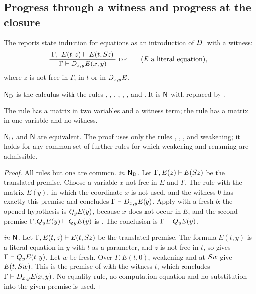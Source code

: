 \subsection{Progress through a witness and progress at the closure}
\label{kern:sec:direct}

The reports state induction for equations as an introduction of $D_{,}$
with a witness:
\[
 \infrule{\Gamma,\ E(t,z)\proves E(t,\Suc z)}
         {\Gamma\proves\D{x}{y}E(x,y)}\ \rulename{DP}
 \qquad(E\text{ a literal equation}),
\]
where $z$ is not free in $\Gamma$, in $t$ or in $D_{x,y}E$.

\begin{definition}
\label{kern:def:ND}
$\mathsf{N}_{\mathrm{D}}$ is the calculus with the rules ,
, , , , ,
 and .  It is $\mathsf{N}$ with  replaced by
.
\end{definition}

The rule  has a matrix in two variables and a witness term; the
rule  has a matrix in one variable and no witness.

\begin{theorem}
\label{kern:thm:direct}
$\mathsf{N}_{\mathrm{D}}$ and $\mathsf{N}$ are equivalent.  The proof uses only the
rules , , ,  and
weakening; it holds for any common set of further rules for which weakening
and renaming are admissible.
\end{theorem}

\begin{proof}
All rules but one are common.  \emph{ in $\mathsf{N}_{\mathrm{D}}$.}
Let $\Gamma,E(z)\vdash E(S z)$ be the translated premise.  Choose a
variable $x$ not free in $E$ and $\Gamma$.  The rule  with the
matrix $E(y)$, in which the coordinate $x$ is not used, and the witness $0$
has exactly this premise and concludes $\Gamma\vdash D_{x,y}E(y)$.  Apply
 with a fresh $b$: the opened hypothesis is $Q_{y}E(y)$, because
$x$ does not occur in $E$, and the second premise
$\Gamma,Q_{y}E(y)\vdash Q_{y}E(y)$ is .  The conclusion is
$\Gamma\vdash Q_{y}E(y)$.

\emph{ in $\mathsf{N}$.}  Let $\Gamma,E(t,z)\vdash E(t,S z)$ be the
translated premise.  The formula $E(t,y)$ is a literal equation in $y$ with
$t$ as a parameter, and $z$ is not free in $t$, so  gives
$\Gamma\vdash Q_{y}E(t,y)$.  Let $w$ be fresh.  Over $\Gamma,E(t,0)$,
weakening and  at $S w$ give $E(t,S w)$.  This is the
premise of  with the witness $t$, which concludes
$\Gamma\vdash D_{x,y}E(x,y)$.  No equality rule, no computation equation and
no substitution into the given premise is used.
\end{proof}

